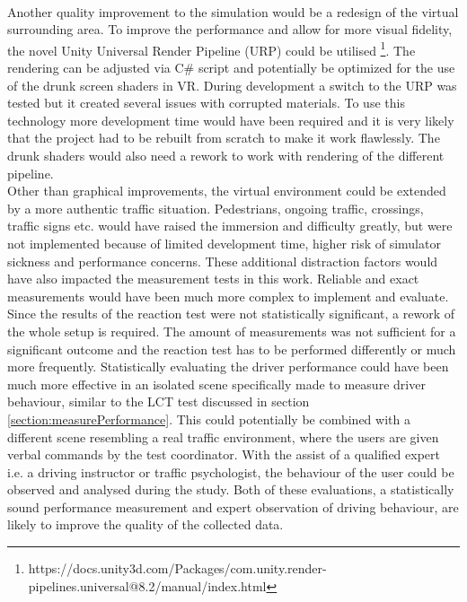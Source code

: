 \\
Another quality improvement to the simulation would be a redesign of the virtual surrounding area.
To improve the performance and allow for more visual fidelity, the novel Unity Universal Render Pipeline (URP) could be utilised \footnote{https://docs.unity3d.com/Packages/com.unity.render-pipelines.universal@8.2/manual/index.html}.
The rendering can be adjusted via C# script and potentially be optimized for the use of the drunk screen shaders in VR.
During development a switch to the URP was tested but it created several issues with corrupted materials.
To use this technology more development time would have been required and it is very likely that the project had to be rebuilt from scratch to make it work flawlessly.
The drunk shaders would also need a rework to work with rendering of the different pipeline.
\\
Other than graphical improvements, the virtual environment could be extended by a more authentic traffic situation.
Pedestrians, ongoing traffic, crossings, traffic signs etc. would have raised the immersion and difficulty greatly, but were not implemented because of limited development time, higher risk of simulator sickness and performance concerns.
These additional distraction factors would have also impacted the measurement tests in this work.
Reliable and exact measurements would have been much more complex to implement and evaluate.
\\
Since the results of the reaction test were not statistically significant, a rework of the whole setup is required.
The amount of measurements was not sufficient for a significant outcome and the reaction test has to be performed differently or much more frequently.
Statistically evaluating the driver performance could have been much more effective in an isolated scene specifically made to measure driver behaviour, similar to the LCT test discussed in section \ref{section:measurePerformance}.
This could potentially be combined with a different scene resembling a real traffic environment, where the users are given verbal commands by the test coordinator.
With the assist of a qualified expert i.e. a driving instructor or traffic psychologist, the behaviour of the user could be observed and analysed during the study.
Both of these evaluations, a statistically sound performance measurement and expert observation of driving behaviour, are likely to improve the quality of the collected data.
\\
